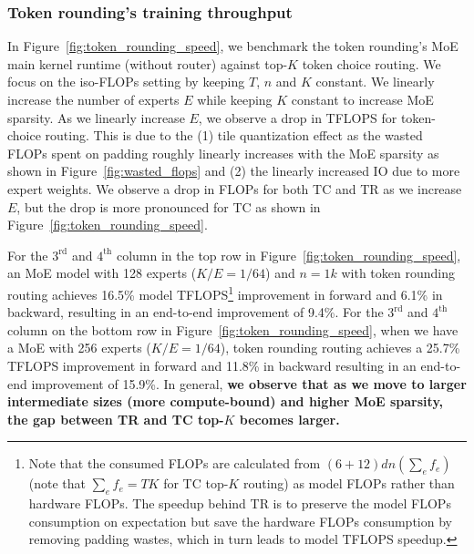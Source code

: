 \subsubsection{Token rounding's training throughput} \label{sec:exp:token_round_throughput}




In Figure~\ref{fig:token_rounding_speed}, we benchmark the token rounding's MoE main kernel runtime (without router) against top-$K$ token choice routing. We focus on the iso-FLOPs setting by keeping $T$, $n$ and $K$ constant. We linearly increase the number of experts $E$ while keeping $K$ constant to increase MoE sparsity. As we linearly increase $E$, we observe a drop in TFLOPS for token-choice routing. This is due to the (1) tile quantization effect as the wasted FLOPs spent on padding roughly linearly increases with the MoE sparsity as shown in Figure~\ref{fig:wasted_flops} and (2) the linearly increased IO due to more expert weights. We observe a drop in FLOPs for both TC and TR as we increase $E$, but the drop is more pronounced for TC as shown in Figure~\ref{fig:token_rounding_speed}. 





For the $3^\text{rd}$ and $4^\text{th}$ column in the top row in Figure~\ref{fig:token_rounding_speed}, an MoE model with 128 experts ($K/E = 1/64$) and $n = 1k$ with token rounding routing achieves 16.5\% model TFLOPS\footnote{Note that the consumed FLOPs are calculated from $(6+12) dn (\sum_e f_e)$ (note that $\sum_e f_e = TK$ for TC top-$K$ routing) as model FLOPs rather than hardware FLOPs. The speedup behind TR is to preserve the model FLOPs consumption on expectation but save the hardware FLOPs consumption by removing padding wastes, which in turn leads to model TFLOPS speedup. } improvement in forward and 6.1\% in backward, resulting in an end-to-end improvement of 9.4\%. For the $3^\text{rd}$ and $4^\text{th}$ column on the bottom row in Figure~\ref{fig:token_rounding_speed}, when we have a MoE with 256 experts ($K/E=1/64$), token rounding routing achieves a 25.7\% TFLOPS improvement in forward and 11.8\% in backward resulting in an end-to-end improvement of 15.9\%. In general, \textbf{we observe that as we move to larger intermediate sizes (more compute-bound) and higher MoE sparsity, the gap between TR and TC top-$K$ becomes larger.}


